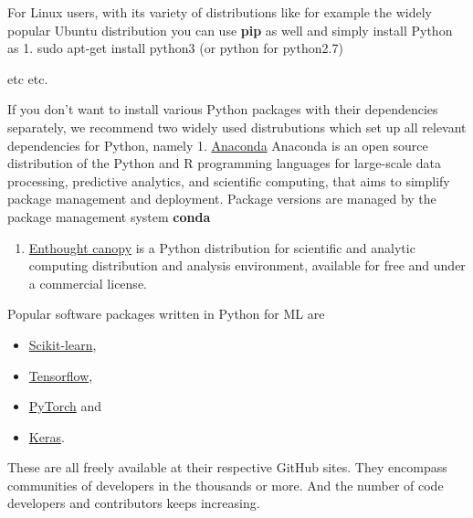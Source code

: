 \documentclass[11pt]{article}
\providecommand{\tightlist}{%
      \setlength{\itemsep}{0pt}\setlength{\parskip}{0pt}}
\begin{document}
For Linux users, with its variety of distributions like for example the
widely popular Ubuntu distribution you can use \textbf{pip} as well and
simply install Python as 1. sudo apt-get install python3 (or python for
python2.7)

etc etc.

If you don't want to install various Python packages with their
dependencies separately, we recommend two widely used distrubutions
which set up all relevant dependencies for Python, namely 1.
\href{https://docs.anaconda.com/}{Anaconda} Anaconda is an open source
distribution of the Python and R programming languages for large-scale
data processing, predictive analytics, and scientific computing, that
aims to simplify package management and deployment. Package versions are
managed by the package management system \textbf{conda}

\begin{enumerate}
\def\labelenumi{\arabic{enumi}.}
\setcounter{enumi}{1}
\tightlist
\item
  \href{https://www.enthought.com/product/canopy/}{Enthought canopy} is
  a Python distribution for scientific and analytic computing
  distribution and analysis environment, available for free and under a
  commercial license.
\end{enumerate}

Popular software packages written in Python for ML are

\begin{itemize}
\item
  \href{http://scikit-learn.org/stable/}{Scikit-learn},
\item
  \href{https://www.tensorflow.org/}{Tensorflow},
\item
  \href{http://pytorch.org/}{PyTorch} and
\item
  \href{https://keras.io/}{Keras}.
\end{itemize}

These are all freely available at their respective GitHub sites. They
encompass communities of developers in the thousands or more. And the
number of code developers and contributors keeps increasing.


    
    
    
\end{document}
